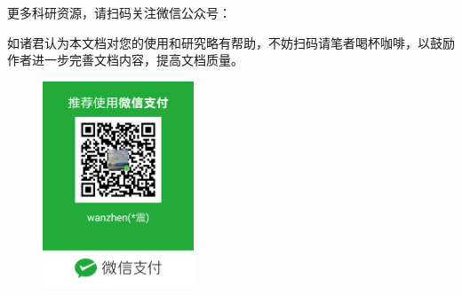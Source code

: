 \newpage

{\color{red}\faHeart}\hspace{0.1cm} 更多科研资源，请扫码关注微信公众号：
\begin{figure}[h]
    \centering
\end{figure}

\vspace{0.5cm}

{\color{red}\faHeart}\hspace{0.1cm} 如诸君认为本文档对您的使用和研究略有帮助，不妨扫码请笔者喝杯咖啡，以鼓励作者进一步完善文档内容，提高文档质量。\dSmiley

\begin{figure}[h]
\begin{center}
\includegraphics[width=0.4\textwidth]{figure/collect_qrcode} 
\end{center}
\end{figure}

\thispagestyle{empty}